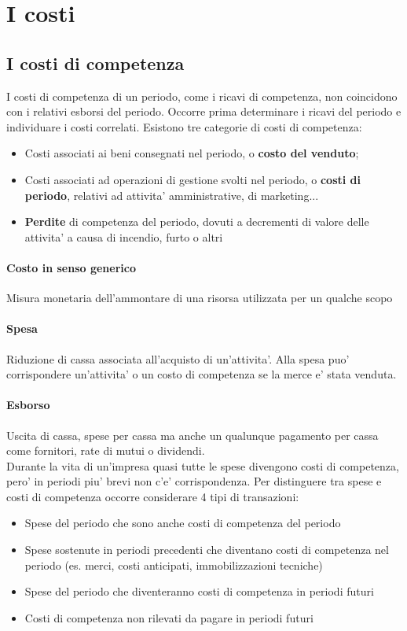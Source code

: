 \documentclass{report}
\begin{document}
	\section{I costi}
	\subsection{I costi di competenza}
	I costi di competenza di un periodo, come i ricavi di competenza, non coincidono con i relativi esborsi del periodo. Occorre prima determinare i ricavi del periodo e individuare i costi correlati.
	Esistono tre categorie di costi di competenza:
	\begin{itemize}
		\item Costi associati ai beni consegnati nel periodo, o \textbf{costo del venduto};
		\item Costi associati ad operazioni di gestione svolti nel periodo, o \textbf{costi di periodo}, relativi ad attivita' amministrative, di marketing...
		\item \textbf{Perdite} di competenza del periodo, dovuti a decrementi di valore delle attivita' a causa di incendio, furto o altri
	\end{itemize}
	\paragraph{Costo in senso generico} Misura monetaria dell'ammontare di una risorsa utilizzata per un qualche scopo
	\paragraph{Spesa} Riduzione di cassa associata all'acquisto di un'attivita'. Alla spesa puo' corrispondere un'attivita' o un costo di competenza se la merce e' stata venduta.
	\paragraph{Esborso} Uscita di cassa, spese per cassa ma anche un qualunque pagamento per cassa come fornitori, rate di mutui o dividendi.
	\medskip \\Durante la vita di un'impresa quasi tutte le spese divengono costi di competenza, pero' in periodi piu' brevi non c'e' corrispondenza. Per distinguere tra spese  e costi di competenza occorre considerare 4 tipi di transazioni:
	\begin{itemize}
		\item Spese del periodo che sono anche costi di competenza del periodo
		\item Spese sostenute in periodi precedenti che diventano costi di competenza nel periodo (es. merci, costi anticipati, immobilizzazioni tecniche)
		\item Spese del periodo che diventeranno costi di competenza in periodi futuri
		\item Costi di competenza non rilevati da pagare in periodi futuri
	\end{itemize}
\end{document}
